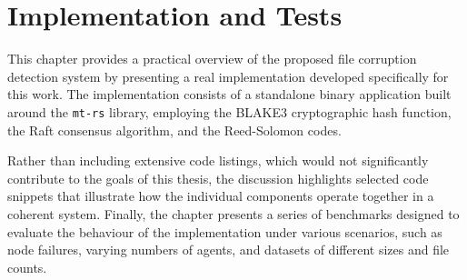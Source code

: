 \chapter{Implementation and Tests}

This chapter provides a practical overview of the proposed file corruption detection system by presenting a real implementation developed specifically for this work. The implementation consists of a standalone binary application built around the \texttt{mt-rs} library, employing the BLAKE3 cryptographic hash function, the Raft consensus algorithm, and the Reed-Solomon codes.

Rather than including extensive code listings, which would not significantly contribute to the goals of this thesis, the discussion highlights selected code snippets that illustrate how the individual components operate together in a coherent system. Finally, the chapter presents a series of benchmarks designed to evaluate the behaviour of the implementation under various scenarios, such as node failures, varying numbers of agents, and datasets of different sizes and file counts.



